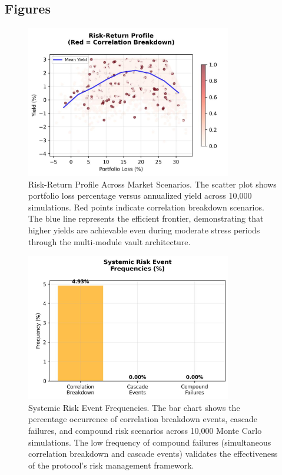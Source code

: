 \documentclass[12pt]{article}
\begin{document}
\newpage
\subsection{Figures}

\begin{figure}[h]
    \centering
    \includegraphics[width=0.8\textwidth]{risk_return_profile.jpeg}
    \caption{Risk-Return Profile Across Market Scenarios. The scatter plot shows portfolio loss percentage versus annualized yield across 10,000 simulations. Red points indicate correlation breakdown scenarios. The blue line represents the efficient frontier, demonstrating that higher yields are achievable even during moderate stress periods through the multi-module vault architecture.}
    \label{fig:risk_return_profile}
\end{figure}

\begin{figure}[h]
    \centering
    \includegraphics[width=0.8\textwidth]{systemic_risk_events.jpeg}
    \caption{Systemic Risk Event Frequencies. The bar chart shows the percentage occurrence of correlation breakdown events, cascade failures, and compound risk scenarios across 10,000 Monte Carlo simulations. The low frequency of compound failures (simultaneous correlation breakdown and cascade events) validates the effectiveness of the protocol's risk management framework.}
    \label{fig:systemic_risk_events}
\end{figure}
\end{document}
